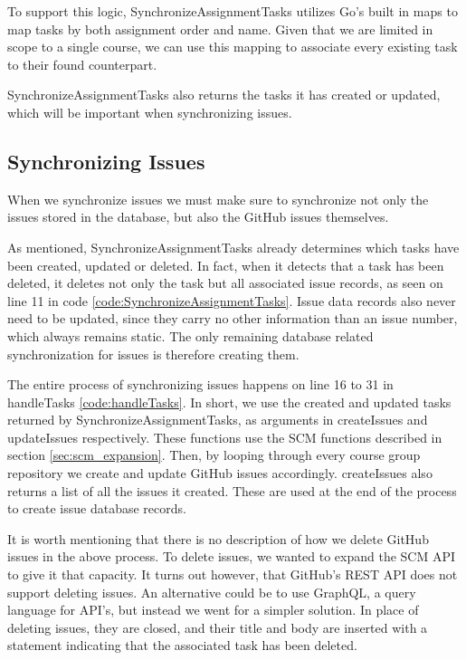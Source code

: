 To support this logic, SynchronizeAssignmentTasks utilizes Go's built in maps to map tasks by both assignment order and name.
Given that we are limited in scope to a single course, we can use this mapping to associate every existing task to their found counterpart.



SynchronizeAssignmentTasks also returns the tasks it has created or updated, which will be important when synchronizing issues.

\subsection{Synchronizing Issues}

When we synchronize issues we must make sure to synchronize not only the issues stored in the database, but also the GitHub issues themselves.

As mentioned, SynchronizeAssignmentTasks already determines which tasks have been created, updated or deleted.
In fact, when it detects that a task has been deleted, it deletes not only the task but all associated issue records, as seen on line 11 in code \ref{code:SynchronizeAssignmentTasks}.
Issue data records also never need to be updated, since they carry no other information than an issue number, which always remains static.
The only remaining database related synchronization for issues is therefore creating them.

The entire process of synchronizing issues happens on line 16 to 31 in handleTasks \ref{code:handleTasks}.
In short, we use the created and updated tasks returned by SynchronizeAssignmentTasks, as arguments in createIssues and updateIssues respectively.
These functions use the SCM functions described in section \ref{sec:scm_expansion}.
Then, by looping through every course group repository we create and update GitHub issues accordingly.
createIssues also returns a list of all the issues it created.
These are used at the end of the process to create issue database records.

It is worth mentioning that there is no description of how we delete GitHub issues in the above process.
To delete issues, we wanted to expand the SCM API to give it that capacity.
It turns out however, that GitHub's REST API does not support deleting issues.
An alternative could be to use GraphQL, a query language for API's, but instead we went for a simpler solution.
In place of deleting issues, they are closed, and their title and body are inserted with a statement indicating that the associated task has been deleted.


